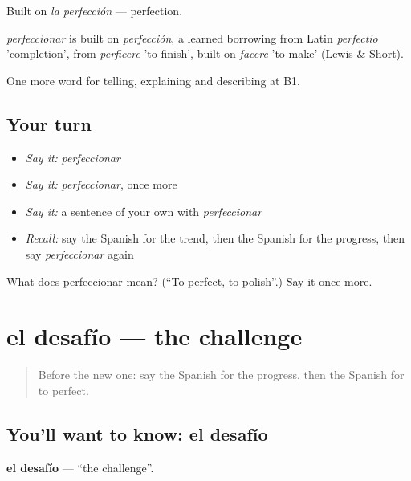 Built on \emph{la perfección} — perfection.

\begin{cousinweb}
\emph{perfeccionar} is built on \emph{perfección}, a learned borrowing from Latin \emph{perfectio} 'completion', from \emph{perficere} 'to finish', built on \emph{facere} 'to make' (Lewis \& Short).
\end{cousinweb}

\begin{grammarlens}[title={What you've built}]
One more word for telling, explaining and describing at B1.
\end{grammarlens}

\subsection*{Your turn}
\begin{itemize}
\raggedright
  \item \emph{Say it:} \emph{perfeccionar}
  \item \emph{Say it:} \emph{perfeccionar}, once more
  \item \emph{Say it:} a sentence of your own with \emph{perfeccionar}
  \item \emph{Recall:} say the Spanish for the trend, then the Spanish for the progress, then say \emph{perfeccionar} again
\end{itemize}

\begin{tcolorbox}[breakable,colback=teal!4,colframe=teal!35!black,title={Before you move on}]
What does perfeccionar mean? (\textquotedblleft{}To perfect, to polish\textquotedblright{}.) Say it once more.
\end{tcolorbox}
\section[el desafío]{el desafío — the challenge}

\label{lesson:ES-C609-desafio}



\begin{quote}
Before the new one: say the Spanish for the progress, then the Spanish for to perfect.
\end{quote}

\subsection*{You'll want to know: el desafío}
\textbf{el desafío} — \textquotedblleft{}the challenge\textquotedblright{}.

